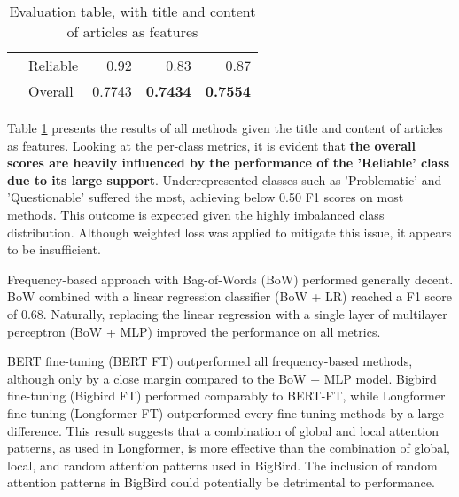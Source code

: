 \begin{table}[htbp]
\begin{longtable}{| c | l | r | r | r |}
                                                          & Reliable           & 0.92               & 0.83            & 0.87            \\\cline{2-5}
                                                          & Overall            & 0.7743             & \textbf{0.7434} & \textbf{0.7554} \\
        \hline
    \end{longtable}
    \caption{Evaluation table, with title and content of articles as features}
    \label{table:eval}
\end{table}

Table \ref{table:eval} presents the results of all methods given the title and content of articles as features. Looking at the per-class metrics, it is evident that \textbf{the overall scores are heavily influenced by the performance of the 'Reliable' class due to its large support}. Underrepresented classes such as 'Problematic' and 'Questionable' suffered the most, achieving below 0.50 F1 scores on most methods. This outcome is expected given the highly imbalanced class distribution. Although weighted loss was applied to mitigate this issue, it appears to be insufficient.

Frequency-based approach with Bag-of-Words (BoW) performed generally decent. BoW combined with a linear regression classifier (BoW + LR) reached a F1 score of 0.68.  Naturally, replacing the linear regression with a single layer of multilayer perceptron (BoW + MLP) improved the performance on all metrics.

BERT fine-tuning (BERT FT) outperformed all frequency-based methods, although only by a close margin compared to the BoW + MLP model. Bigbird fine-tuning (Bigbird FT) performed comparably to BERT-FT, while Longformer fine-tuning (Longformer FT) outperformed every fine-tuning methods by a large difference. This result suggests that a combination of global and local attention patterns, as used in Longformer, is more effective than the combination of global, local, and random attention patterns used in BigBird. The inclusion of random attention patterns in BigBird could potentially be detrimental to performance.

